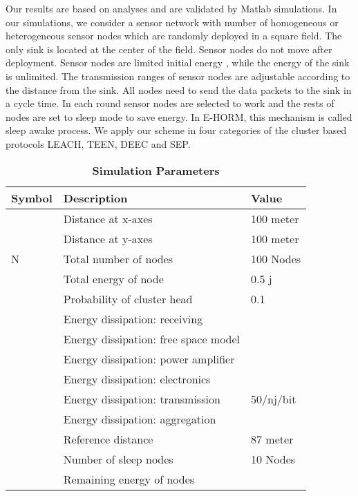 \documentclass{article}
\begin{document}
Our results are based on analyses and are validated by Matlab simulations. In our simulations, we consider a sensor network with  number of homogeneous or heterogeneous sensor nodes which are randomly deployed in a square field. The only sink is located at the center of the field. Sensor nodes do not move after deployment. Sensor nodes are limited initial energy , while the energy of the sink is unlimited. The transmission ranges of sensor nodes are adjustable according to the distance from the sink. All nodes need to send the data packets to the sink in a cycle time. In each round sensor nodes are selected to work and the rests of nodes are set to sleep mode to save energy. In E-HORM, this mechanism is called sleep awake process. We apply our scheme in four categories of the cluster based protocols LEACH, TEEN, DEEC and SEP.\\ \begin{table}[h!]
  \centering
  \caption{\textbf{Simulation Parameters}}  \vspace{0.5cm}
  \tiny
  \begin{tabular}{|l|l|l|}\hline
  \textbf{Symbol} &\textbf{Description}   &\textbf{Value}\\ \hline
      & Distance at x-axes &100 meter \\ \hline
      &Distance at y-axes  &100 meter\\ \hline
     N     &Total number of nodes & 100 Nodes \\ \hline
      &Total energy of node & 0.5 j \\ \hline
        &Probability of cluster head & 0.1 \\ \hline
     &Energy dissipation: receiving & \\ \hline
     &Energy dissipation: free space model & \\ \hline
    &Energy dissipation: power amplifier &  \\ \hline
     &Energy dissipation: electronics   &  \\ \hline
      &Energy dissipation: transmission   & 50/nj/bit \\ \hline
      &Energy dissipation: aggregation    &  \\ \hline
         &Reference distance                 & 87 meter  \\ \hline
          &Number of sleep nodes               & 10 Nodes\\ \hline
            &Remaining energy of nodes               & \\ \hline
    \end{tabular}\label{tab:addlabel}\end{table}
\end{document}
